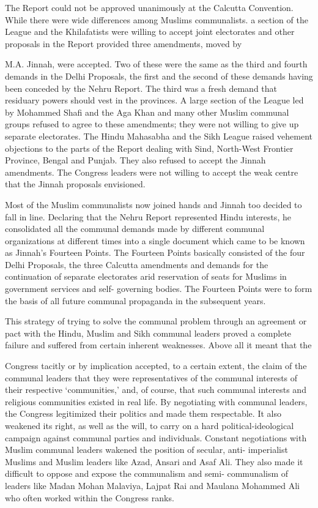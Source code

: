 The Report could not be approved unanimously at the Calcutta Convention. While there were wide differences among Muslims communalists. a section of the League and the Khilafatists were willing to accept joint electorates and other proposals in the Report provided three amendments, moved by 

M.A. Jinnah, were accepted. Two of these were the same as the third and fourth demands in the Delhi Proposals, the first and the second of these demands having been conceded by the Nehru Report. The third was a fresh demand that residuary powers should vest in the provinces. A large section of the League led by Mohammed Shafi and the Aga Khan and many other Muslim communal groups refused to agree to these amendments; they were not willing to give up separate electorates. The Hindu Mahasabha and the Sikh League raised vehement objections to the parts of the Report dealing with Sind, North-West Frontier Province, Bengal and Punjab. They also refused to accept the Jinnah amendments. The Congress leaders were not willing to accept the weak centre that the Jinnah proposals envisioned. 

Most of the Muslim communalists now joined hands and Jinnah too decided to fall in line. Declaring that the Nehru Report represented Hindu interests, he consolidated all the communal demands made by different communal organizations at different times into a single document which came to be known as Jinnah's Fourteen Points. The Fourteen Points basically consisted of the four Delhi Proposals, the three Calcutta amendments and demands for the continuation of separate electorates arid reservation of seats for Muslims in government services and self- governing bodies. The Fourteen Points were to form the basis of all future communal propaganda in the subsequent years. 

This strategy of trying to solve the communal problem through an agreement or pact with the Hindu, Muslim and Sikh communal leaders proved a complete failure and suffered from certain inherent weaknesses. Above all it meant that the 

Congress tacitly or by implication accepted, to a certain extent, the claim of the communal leaders that they were representatives of the communal interests of their respective `communities,' and, of course, that such communal interests and religious communities existed in real life. By negotiating with communal leaders, the Congress legitimized their politics and made them respectable. It also weakened its right, as well as the will, to carry on a hard political-ideological campaign against communal parties and individuals. Constant negotiations with Muslim communal leaders wakened the position of secular, anti- imperialist Muslims and Muslim leaders like Azad, Ansari and Asaf Ali. They also made it difficult to oppose and expose the communalism and semi- communalism of leaders like Madan Mohan Malaviya, Lajpat Rai and Maulana Mohammed Ali who often worked within the Congress ranks. 

